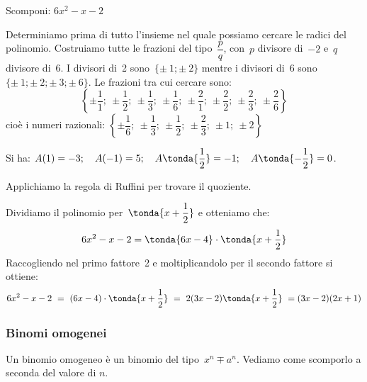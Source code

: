 \begin{esempio}{}{}
Scomponi: \(6x^2-x-2\)

Determiniamo prima di tutto l'insieme nel quale
possiamo cercare le radici del polinomio. Costruiamo tutte le frazioni
del tipo~\(\dfrac{p}{q}\), con~\(p\) divisore di~\(-2\) e~\(q\) divisore 
di~\(6\). 
I divisori di~2 sono~\(\{\pm~1;\pm~2\}\) 
mentre i divisori di~6 sono~\(\{\pm~1;\pm~2;\pm~3;\pm~6\}\).
Le frazioni tra cui cercare sono:
\[\left\{
\pm \dfrac{1}{1};~\pm \dfrac{1}{2};~\pm \dfrac{1}{3};~\pm \dfrac{1}{6};~
\pm \dfrac{2}{1};~\pm \dfrac{2}{2};~\pm \dfrac{2}{3};~\pm 
\dfrac{2}{6}\right\}\]
cioè i numeri razionali: \quad
\(\left\{
\pm \dfrac{1}{6};~\pm \dfrac{1}{3};~\pm \dfrac{1}{2};~\pm \dfrac{2}{3};~
\pm 1;~\pm 2 \right\}\)

Si ha: \quad \(A(1)=-3; \quad A(-1)=5; \quad A\tonda{\dfrac{1}{2}}=-1; 
       \quad A\tonda{-\dfrac{1}{2}}=0\).

Applichiamo la regola di Ruffini per trovare il quoziente.

{
Dividiamo il polinomio per~\(\tonda{x+\dfrac{1}{2}}\) e otteniamo che:
\vspace{-2mm}
\[6x^2-x-2 = \tonda{6x-4} \cdot \tonda{x+\dfrac{1}{2}}\]
}
{
}
Raccogliendo nel primo fattore~2 e moltiplicandolo per il secondo 
fattore si ottiene:
\[6x^2-x-2\ =
\ (6x-4)\cdot \tonda{x+\dfrac{1}{2}}\ =
\ 2(3x-2)\tonda{x+\dfrac{1}{2}}\ =(3x-2)(2x+1)\]
\end{esempio}




\subsubsection{Binomi omogenei}
\label{subsubsec:divpol_binomo}

Un binomio omogeneo è un binomio del tipo~\(x^{n} \mp a^{n}\).
Vediamo come scomporlo a seconda del valore di \(n\).

